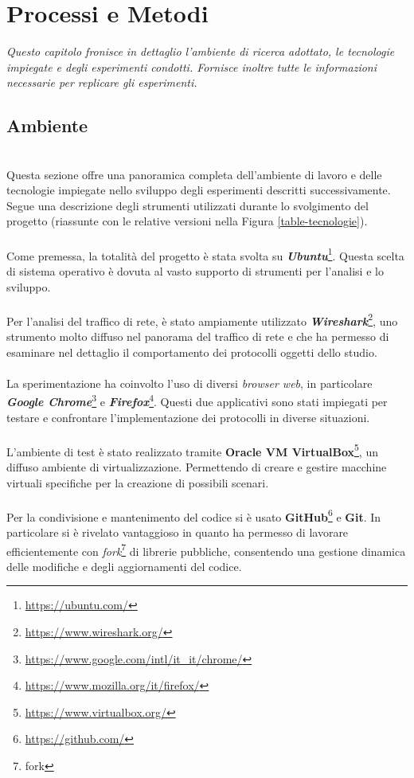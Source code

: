 \chapter{Processi e Metodi}
\label{cap:processi-metodologie}

\textit{\indent Questo capitolo fronisce in dettaglio l'ambiente di ricerca adottato, le tecnologie impiegate e degli esperimenti condotti. 
Fornisce inoltre tutte le informazioni necessarie per replicare gli esperimenti.}

\section{Ambiente}
~\\
\indent Questa sezione offre una panoramica completa dell'ambiente di lavoro e delle tecnologie impiegate nello sviluppo degli esperimenti descritti successivamente. 
Segue una descrizione degli strumenti utilizzati durante lo svolgimento del progetto (riassunte con le relative versioni nella Figura \ref{table-tecnologie}).
\\\\
Come premessa, la totalità del progetto è stata svolta su \textbf{\emph{Ubuntu}}\footnote{\url{https://ubuntu.com/}}. 
Questa scelta di sistema operativo è dovuta al vasto supporto di strumenti per l'analisi e lo sviluppo.
\\\\
Per l'analisi del traffico di rete, è stato ampiamente utilizzato \textbf{\emph{Wireshark}}\footnote{\url{https://www.wireshark.org/}}, 
uno strumento molto diffuso nel panorama del traffico di rete e che ha permesso di esaminare nel dettaglio il comportamento dei protocolli oggetti dello studio.
\\\\
La sperimentazione ha coinvolto l'uso di diversi \emph{browser web}, in particolare \textbf{\emph{Google Chrome}}\footnote{\url{https://www.google.com/intl/it_it/chrome/}} e \textbf{\emph{Firefox}}\footnote{\url{https://www.mozilla.org/it/firefox/}}. 
Questi due applicativi sono stati impiegati per testare e confrontare l'implementazione dei protocolli in diverse situazioni.
\\\\
L'ambiente di test è stato realizzato tramite \textbf{Oracle VM VirtualBox}\footnote{\url{https://www.virtualbox.org/}}, un diffuso ambiente di virtualizzazione. 
Permettendo di creare e gestire macchine virtuali specifiche per la creazione di possibili scenari.
\\\\
Per la condivisione e mantenimento del codice si è usato \textbf{GitHub}\footnote{\url{https://github.com/}} e \textbf{Git}.
In particolare si è rivelato vantaggioso in quanto ha permesso di lavorare efficientemente con \emph{fork}\footnote{\gls{fork}} di librerie pubbliche, consentendo una gestione dinamica delle modifiche e degli aggiornamenti del codice.

